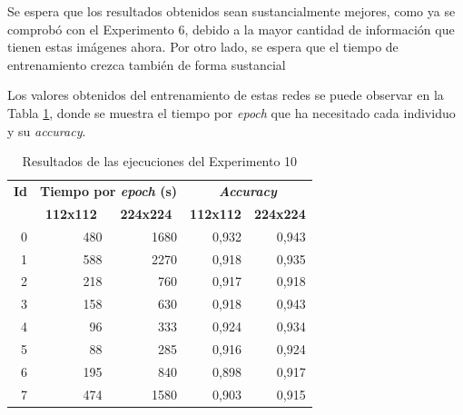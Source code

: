 Se espera que los resultados obtenidos sean sustancialmente mejores, como ya se comprobó con el Experimento 6, debido a la mayor cantidad de información que tienen estas imágenes ahora. Por otro lado, se espera que el tiempo de entrenamiento crezca también de forma sustancial

Los valores obtenidos del entrenamiento de estas redes se puede observar en la Tabla \ref{tab:exp10_resultado}, donde se muestra el tiempo por \textit{epoch} que ha necesitado cada individuo y su \textit{accuracy}.

\begin{table}[h]
\caption{Resultados de las ejecuciones del Experimento 10}
\label{tab:exp10_resultado}
\centering
\begin{tabular}{r|r|r|rr}
\toprule
\multicolumn{1}{c|}{\textbf{Id}} & \multicolumn{2}{c|}{\textbf{Tiempo por \textit{epoch} (s)}}                            & \multicolumn{2}{c}{\textbf{\textit{Accuracy}}}                                        \\
\multicolumn{1}{c|}{\textbf{}}   & \multicolumn{1}{c|}{\textbf{112x112}} & \multicolumn{1}{c|}{\textbf{224x224}} & \multicolumn{1}{c|}{\textbf{112x112}} & \multicolumn{1}{c}{\textbf{224x224}} \\ \hline
0                                & 480                                   & 1680                                  & \multicolumn{1}{r|}{0,932}            & 0,943
                                   \\
1                                & 588                                   & 2270                                  & \multicolumn{1}{r|}{0,918}            & 0,935
                                    \\
2                                & 218                                   & 760                                   & \multicolumn{1}{r|}{0,917}            & 0,918
                                    \\
3                                & 158                                   & 630                                   & \multicolumn{1}{r|}{0,918}            & 0,943                                    \\
4                                & 96                                    & 333                                   & \multicolumn{1}{r|}{0,924}            & 0,934                                    \\
5                                & 88                                    & 285                                   & \multicolumn{1}{r|}{0,916}            & 0,924
                                    \\
6                                & 195                                   & 840                                   & \multicolumn{1}{r|}{0,898}            & 0,917
                                    \\
7                                & 474                                   & 1580                                  & \multicolumn{1}{r|}{0,903}            & 0,915      \\
\bottomrule
\end{tabular}
\end{table}

